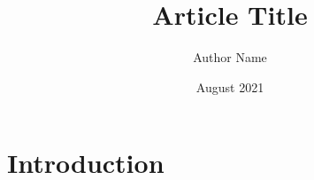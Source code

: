 \documentclass{article}
\title{Article Title}
\author{Author Name}
\date{August 2021}
\begin{document}
\maketitle

\section{Introduction}
\end{document}
